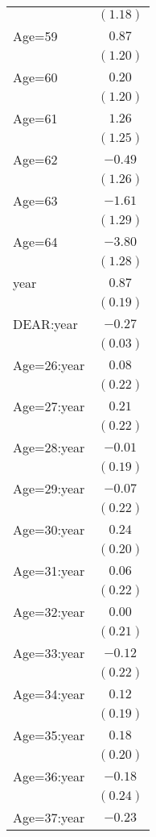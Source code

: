 \documentclass[fullpage]{paper}
\begin{document}
\begin{center}
\begin{longtable}{l c }
            & $(1.18)$ \\
Age=59      & $0.87$   \\
            & $(1.20)$ \\
Age=60      & $0.20$   \\
            & $(1.20)$ \\
Age=61      & $1.26$   \\
            & $(1.25)$ \\
Age=62      & $-0.49$  \\
            & $(1.26)$ \\
Age=63      & $-1.61$  \\
            & $(1.29)$ \\
Age=64      & $-3.80$  \\
            & $(1.28)$ \\
year        & $0.87$   \\
            & $(0.19)$ \\
DEAR:year   & $-0.27$  \\
            & $(0.03)$ \\
Age=26:year & $0.08$   \\
            & $(0.22)$ \\
Age=27:year & $0.21$   \\
            & $(0.22)$ \\
Age=28:year & $-0.01$  \\
            & $(0.19)$ \\
Age=29:year & $-0.07$  \\
            & $(0.22)$ \\
Age=30:year & $0.24$   \\
            & $(0.20)$ \\
Age=31:year & $0.06$   \\
            & $(0.22)$ \\
Age=32:year & $0.00$   \\
            & $(0.21)$ \\
Age=33:year & $-0.12$  \\
            & $(0.22)$ \\
Age=34:year & $0.12$   \\
            & $(0.19)$ \\
Age=35:year & $0.18$   \\
            & $(0.20)$ \\
Age=36:year & $-0.18$  \\
            & $(0.24)$ \\
Age=37:year & $-0.23$  \\

\end{longtable}
\end{center}
\end{document}

